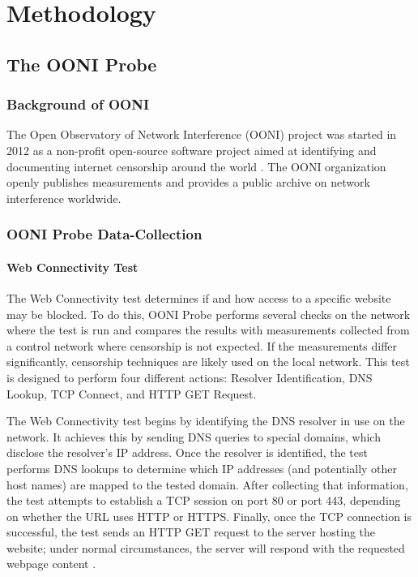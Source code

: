 \chapter{Methodology}

\section{The OONI Probe}

\subsection{Background of OONI}

The Open Observatory of Network Interference (OONI) project was started in 2012 as a non-profit open-source software project aimed at identifying and documenting internet censorship around the world \cite{ooniAbout}. The OONI organization openly publishes measurements and provides a public archive on network interference worldwide. 

\subsection{OONI Probe Data-Collection}

\subsubsection{Web Connectivity Test}

The Web Connectivity test determines if and how access to a specific website may be blocked. To do this, OONI Probe performs several checks on the network where the test is run and compares the results with measurements collected from a control network where censorship is not expected. If the measurements differ significantly, censorship techniques are likely used on the local network. This test is designed to perform four different actions: Resolver Identification, DNS Lookup, TCP Connect, and HTTP GET Request.

The Web Connectivity test begins by identifying the DNS resolver in use on the network. It achieves this by sending DNS queries to special domains, which disclose the resolver’s IP address. Once the resolver is identified, the test performs DNS lookups to determine which IP addresses (and potentially other host names) are mapped to the tested domain. After collecting that information, the test attempts to establish a TCP session on port 80 or port 443, depending on whether the URL uses HTTP or HTTPS. Finally, once the TCP connection is successful, the test sends an HTTP GET request to the server hosting the website; under normal circumstances, the server will respond with the requested webpage content \cite{ooniConnectivityTest}.

